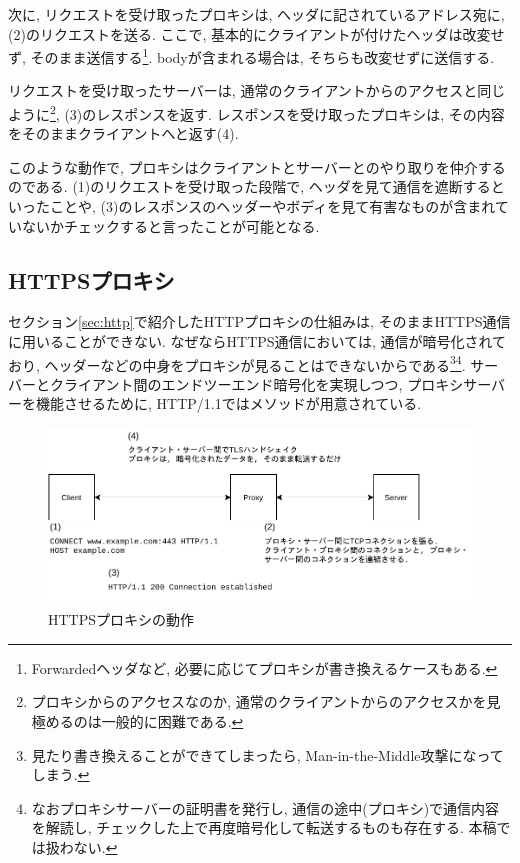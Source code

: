 \documentclass[a4paper,uplatex,a4j,dvipdfmx]{jsarticle}
\begin{document}
\begin{multicols}{2}
    次に, リクエストを受け取ったプロキシは, ヘッダに記されているアドレス宛に, (2)のリクエストを送る. ここで, 基本的にクライアントが付けたヘッダは改変せず, そのまま送信する\footnote{Forwardedヘッダ\cite{rfc:7239}など, 必要に応じてプロキシが書き換えるケースもある.}. bodyが含まれる場合は, そちらも改変せずに送信する.
    
    リクエストを受け取ったサーバーは, 通常のクライアントからのアクセスと同じように\footnote{プロキシからのアクセスなのか, 通常のクライアントからのアクセスかを見極めるのは一般的に困難である.}, (3)のレスポンスを返す. レスポンスを受け取ったプロキシは, その内容をそのままクライアントへと返す(4).
    
    このような動作で, プロキシはクライアントとサーバーとのやり取りを仲介するのである. (1)のリクエストを受け取った段階で, ヘッダを見て通信を遮断するといったことや, (3)のレスポンスのヘッダーやボディを見て有害なものが含まれていないかチェックすると言ったことが可能となる.

    \subsection{HTTPSプロキシ}
    セクション\ref{sec:http}で紹介したHTTPプロキシの仕組みは, そのままHTTPS通信に用いることができない. なぜならHTTPS通信においては, 通信が暗号化されており, ヘッダーなどの中身をプロキシが見ることはできないからである\footnote{見たり書き換えることができてしまったら, Man-in-the-Middle攻撃になってしまう.}\footnote{なおプロキシサーバーの証明書を発行し, 通信の途中(プロキシ)で通信内容を解読し, チェックした上で再度暗号化して転送するものも存在する. 本稿では扱わない.}.
    サーバーとクライアント間のエンドツーエンド暗号化を実現しつつ, プロキシサーバーを機能させるために, HTTP/1.1ではメソッドが用意されている\cite{rfc:7231}.

    \begin{figure}[tb]
      \center
      \includegraphics[width=14cm]{img/proxyhttps.pdf}
      \caption{HTTPSプロキシの動作 \label{img:proxy:https}}
    \end{figure}
    

\end{multicols}
\end{document}

